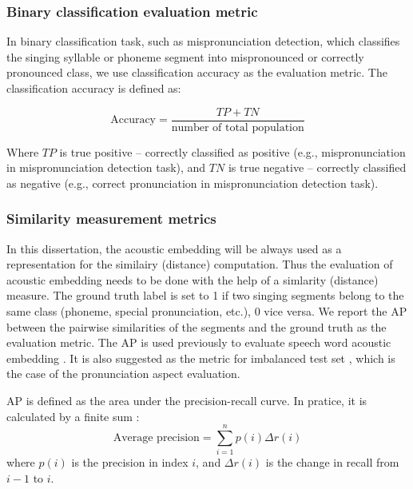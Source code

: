 \subsubsection{Binary classification evaluation metric}\label{sec:ch2:binary_classification_metric}

In binary classification task, such as mispronunciation detection, which classifies the singing syllable or phoneme segment into mispronounced or correctly pronounced class, we use classification accuracy as the evaluation metric. The classification accuracy is defined as:

\begin{equation}
\textrm{Accuracy} = \frac{TP + TN}{\textrm{number of total population}}
\end{equation}

Where $TP$ is true positive -- correctly classified as positive (e.g., mispronunciation in mispronunciation detection task), and $TN$ is true negative -- correctly classified as negative (e.g., correct pronunciation in mispronunciation detection task). 

\subsubsection{Similarity measurement metrics}

In this dissertation, the acoustic embedding will be always used as a representation for the similairy (distance) computation. Thus the evaluation of acoustic embedding needs to be done with the help of a simlarity (distance) measure. The ground truth label is set to 1 if two singing segments belong to the same class (phoneme, special pronunciation, etc.), 0 vice versa. We report the \gls{AP} between the pairwise similarities of the segments and the ground truth as the evaluation metric. The \gls{AP} is used previously to evaluate speech word acoustic embedding \cite{Kampera,Settle2016a}. It is also suggested as the metric for imbalanced test set \cite{Davis2006}, which is the case of the pronunciation aspect evaluation.

\gls{AP} is defined as the area under the precision-recall curve. In pratice, it is calculated by a finite sum :
\begin{equation}
\textrm{Average precision} = \sum_{i=1}^{n} p(i)\Delta r(i)
\end{equation} 
where $p(i)$ is the precision in index $i$, and  $\Delta r(i)$ is the change in recall from $i-1$ to $i$.

